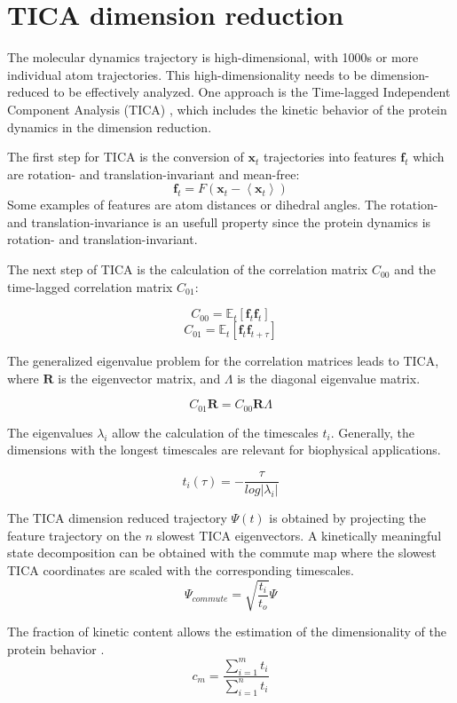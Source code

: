 \section{TICA dimension reduction}

The molecular dynamics trajectory is high-dimensional, with 1000s or more individual atom trajectories. This high-dimensionality needs to be dimension-reduced to be effectively analyzed. One approach is the Time-lagged
Independent Component Analysis (TICA) \cite{TICA1-perez2013, TICA2-schwantes2013}, which includes the kinetic behavior of the protein dynamics in the dimension reduction.

The first step for TICA is the conversion of $\mathbf{x}_{t}$ trajectories into features $\mathbf{f}_{t}$ which are rotation- and translation-invariant and mean-free:
$$\mathbf{f}_{t}=F\left(\mathbf{x}_{t}-\left\langle \mathbf{x}_{t}\right\rangle \right)$$  
Some examples of features are atom distances or dihedral angles. The rotation- and translation-invariance is an usefull property since the protein dynamics is rotation- and translation-invariant.

The next step of TICA is the calculation of the correlation matrix $C_{00}$ and the time-lagged correlation matrix $C_{01}$:

$$C_{00}=\ensuremath{\mathbb{E}}_{t}\left[\mathbf{f}_{t}\mathbf{f}_{t}\right]$$
$$C_{01}=\ensuremath{\mathbb{E}}_{t}\left[\mathbf{f}_{t}\mathbf{f}_{t+\tau}\right]$$

The generalized eigenvalue problem for the correlation matrices leads to TICA, where $\mathbf{R}$ is the eigenvector matrix, and $\mathbf{\varLambda}$ is the diagonal eigenvalue matrix. 

$$C_{01}\mathbf{R}=C_{00}\mathbf{R}\mathbf{\varLambda}$$

The eigenvalues $\lambda_{i}$ allow the calculation of the timescales $t_{i}$. Generally, the dimensions with the longest timescales are relevant for biophysical applications.

$$t_{i}(\tau)=-\frac{\tau}{log\left|\lambda_{i}\right|}$$ 

The TICA dimension reduced trajectory $\varPsi(t)$ is obtained by projecting the feature trajectory on the $n$ slowest TICA eigenvectors. A kinetically meaningful state decomposition can be obtained with the commute map\cite{noe2016commute} where the slowest TICA coordinates are scaled with the corresponding timescales.
$$\varPsi_{commute}=\sqrt{\frac{t_{i}}{t_{o}}}\varPsi$$

The fraction of kinetic content allows the estimation of the dimensionality of the protein behavior \cite{noe2016commute}.
$$c_{m}=\frac{\sum_{i=1}^{m}t_{i}}{\sum_{i=1}^{n}t_{i}}$$

